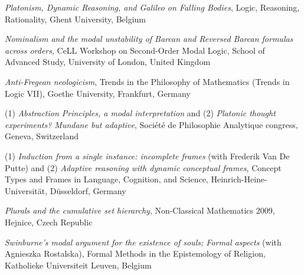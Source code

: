 \documentclass[10pt, a4paper]{article}
\newcommand{\years}[1]{\marginnote{\normalsize #1}}
\begin{document}
\vspace{0.5mm}



\years{2010} \emph{Platonism,   Dynamic   Reasoning,   and   Galileo   on   Falling   Bodies}, Logic,   Reasoning,   Rationality,  Ghent   University,
Belgium



\vspace{0.5mm}




  \emph{Nominalism and the modal unstability of Barcan and Reversed Barcan formulas across orders},     CeLL Workshop on Second-Order Modal Logic,  School of Advanced Study, University of London, United Kingdom

\vspace{0.5mm}



  \years{2009} \emph{Anti-Fregean neologicism}, Trends in the Philosophy of Mathematics (Trends in Logic VII),     Goethe University, Frankfurt, Germany


\vspace{0.5mm}


  (1) \emph{Abstraction Principles, a modal interpretation} and (2)   \emph{Platonic  thought   experiments?  Mundane   but  adaptive}, Soci\'et\'e de Philosophie Analytique  congress,
    Geneva, Switzerland


\vspace{0.5mm}



(1)  \emph{Induction from a single instance: incomplete frames} (with Frederik Van De Putte) and (2)   \emph{Adaptive reasoning with dynamic conceptual frames},
  Concept Types and Frames in Language, Cognition, and Science,      Heinrich-Heine-Universit\" at, D\"usseldorf, Germany


\vspace{0.5mm}




 \emph{Plurals and the cumulative set hierarchy},   Non-Classical Mathematics 2009,    Hejnice, Czech Republic


\vspace{0.5mm}


\emph{Swinburne's modal argument for the existence of souls; Formal aspects} (with Agnieszka Rostalska),  Formal Methods in the Epistemology of Religion,   Katholieke Universiteit Leuven, Belgium


\vspace{0.5mm}
\end{document}
